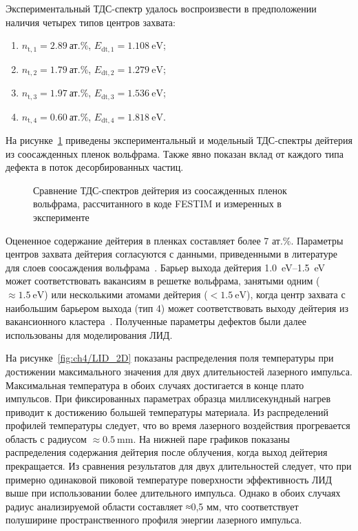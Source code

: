 Экспериментальный ТДС-спектр удалось воспроизвести в предположении наличия четырех типов центров захвата:
\begin{enumerate}[beginpenalty=10000]
    \item \( n_\mathrm{t,1}=\SI{2.89}{\text{ат.}\percent} \), \( E_\mathrm{dt,1}=\SI{1.108}{\electronvolt} \);
    \item \( n_\mathrm{t,2}=\SI{1.79}{\text{ат.}\percent} \), \( E_\mathrm{dt,2}=\SI{1.279}{\electronvolt} \);
    \item \( n_\mathrm{t,3}=\SI{1.97}{\text{ат.}\percent} \), \( E_\mathrm{dt,3}=\SI{1.536}{\electronvolt} \);
    \item \( n_\mathrm{t,4}=\SI{0.60}{\text{ат.}\percent} \), \( E_\mathrm{dt,4}=\SI{1.818}{\electronvolt} \).
\end{enumerate}
На рисунке~\cref{fig:ch4/LID_TDS} приведены экспериментальный и модельный ТДС-спектры дейтерия из соосажденных пленок вольфрама. Также явно показан вклад от каждого типа дефекта в поток десорбированных частиц.

\begin{figure}[ht]
    \caption{Сравнение ТДС-спектров дейтерия из соосажденных пленок вольфрама, рассчитанного в коде FESTIM и измеренных в эксперименте}\label{fig:ch4/LID_TDS}
\end{figure}

Оцененное содержание дейтерия в пленках составляет более 7 ат.\%. Параметры центров захвата дейтерия согласуются с данными, приведенными в литературе для слоев соосаждения вольфрама~\cite{Krat2018}. Барьер выхода дейтерия \SIrange{1.0}{1.5}{\electronvolt} может соответствовать вакансиям в решетке вольфрама, занятыми одним (\(\approx\SI{1.5}{\electronvolt}\)) или несколькими атомами дейтерия (\(<\SI{1.5}{\electronvolt}\)), когда центр захвата с наибольшим барьером выхода (тип 4) может соответствовать выходу дейтерия из вакансионного кластера~\cite{Ogorodnikova2015}. Полученные параметры дефектов были далее использованы для моделирования ЛИД.

На рисунке~\cref{fig:ch4/LID_2D} показаны распределения поля температуры при достижении максимального значения для двух длительностей лазерного импульса. Максимальная температура в обоих случаях достигается в конце плато импульсов. При фиксированных параметрах образца миллисекундный нагрев приводит к достижению большей температуры материала. Из распределений профилей температуры следует, что во время лазерного воздействия прогревается область с радиусом \( \approx \SI{0.5}{\milli\meter} \). На нижней паре графиков показаны распределения содержания дейтерия после облучения, когда выход дейтерия прекращается. Из сравнения результатов для двух длительностей следует, что при примерно одинаковой пиковой температуре поверхности эффективность ЛИД выше при использовании более длительного импульса. Однако в обоих случаях радиус анализируемой области составляет ≈0,5 мм, что соответствует полуширине пространственного профиля энергии лазерного импульса.

